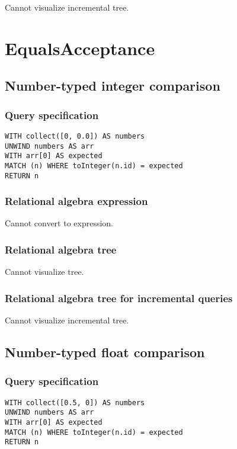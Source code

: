 Cannot visualize incremental tree.

\section{EqualsAcceptance}

\subsection{Number-typed integer comparison}

\subsubsection*{Query specification}

\begin{lstlisting}
WITH collect([0, 0.0]) AS numbers
UNWIND numbers AS arr
WITH arr[0] AS expected
MATCH (n) WHERE toInteger(n.id) = expected
RETURN n
\end{lstlisting}

\subsubsection*{Relational algebra expression}

Cannot convert to expression.

\subsubsection*{Relational algebra tree}

Cannot visualize tree.

\subsubsection*{Relational algebra tree for incremental queries}

Cannot visualize incremental tree.

\subsection{Number-typed float comparison}

\subsubsection*{Query specification}

\begin{lstlisting}
WITH collect([0.5, 0]) AS numbers
UNWIND numbers AS arr
WITH arr[0] AS expected
MATCH (n) WHERE toInteger(n.id) = expected
RETURN n
\end{lstlisting}

